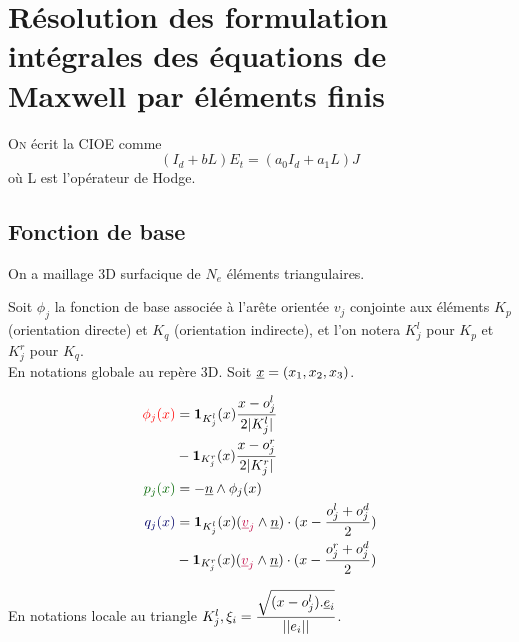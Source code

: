 \section{Résolution des formulation intégrales des équations de Maxwell par éléments finis}
\lettrine{O}{n} écrit la CIOE comme
\[
  (I_d + bL)E_t = (a_0I_d+a_1L)J
\]
où L est l'opérateur de Hodge.
\subsection{Fonction de base}
On a maillage 3D surfacique de $N_e$ éléments triangulaires.

Soit $\phi_j$ la fonction de base associée à l’arête orientée $v_j$ conjointe aux éléments $K_p$ (orientation directe) et $K_q$ (orientation indirecte), et l'on notera $K_j^l$ pour $K_p$ et $K_j^r$ pour $K_q$.\\

En notations globale au repère 3D. 
Soit $\v x = (x_1,x_2,x_3)$.

{ 
\color{red}{TODO: mettre source des fonctions RT - RWG}
}

\begin{minipage}{0.4\textwidth}
\begin{align*}
	\color{red}{\phi_j(x)} &= \mathbf{1}_{K_j^l}(x)\frac{x-o_j^l}{2|K_j^l|} \\&- \mathbf{1}_{K_j^r}(x)\frac{x-o_j^r}{2|K_j^r|}\\
	\color{black!60!green}{p_j(x)} &= -\n \pvect \phi_j(x)\\
	\color{black!60!blue}{q_j(x)} &= \mathbf{1}_{K_j^l}(x) ( { \color{purple}{\v v_j } } \pvect \n ) \cdot ( x - \frac{o^l_j + o^d_j}{2} ) \\
 &- \mathbf{1}_{K_j^r}(x) ( { \color{purple}{\v v_j } } \pvect \n ) \cdot ( x - \frac{o^r_j + o^d_j}{2} )
\end{align*}
\end{minipage}
\begin{minipage}{0.58\textwidth}
	\centering
	\begin{tikzpicture}[scale=2.5]
	
	\end{tikzpicture}
\end{minipage} 

En notations locale au triangle $K_j^l, \xi_i = \frac{\sqrt{(x-o^l_j).\v e_i}}{||e_i||}$.

